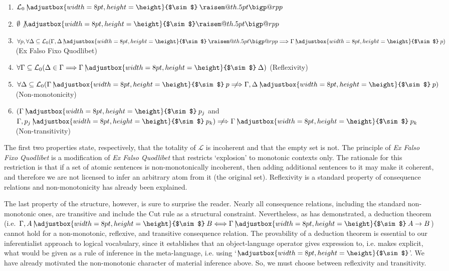 \documentclass{svjour3}                     %
\makeatletter
\newcommand{\raisemath}[1]{\mathpalette{\raisem@th{#1}}}
\newcommand{\raisem@th}[3]{\raisebox{#1}{$#2#3$}}
\newcommand{\bigperpp}{%
  \mathop{\mathpalette\bigp@rpp\relax}%
  \displaylimits
}
\newcommand{\bigp@rpp}[2]{%
  \vcenter{
    \m@th\hbox{\scalebox{\ifx#1\displaystyle1.3\else1.3\fi}{$#1\perp$}}
  }%
}
\newcommand{\bigperp}{\raisemath{.5pt}{\bigperpp}}
\newcommand{\ssim}{%
     \setbox0=\hbox{$\sim$}%
     \adjustbox{width=8pt,height=\height}{$\sim$}
}
\newcommand{\nmc}{\mathbin{\mid\joinrel\!\!\ssim}}
\makeatother
\begin{document}
\begin{enumerate}
\item $ \mathcal{L}_0\nmc\bigperp$
\item $ \emptyset\not\nmc\bigperp $
\item $ \forall p, \forall\Delta\subseteq\mathcal{L}_0(\Gamma, \Delta \nmc\bigperp \Longrightarrow \Gamma\nmc p) $ (Ex Falso Fixo Quodlibet)
\item $\forall \Gamma\subseteq\mathcal{L}_0 (\Delta \in \Gamma \Longrightarrow \Gamma\nmc \Delta)$ (Reflexivity)
\item $\forall\Delta\subseteq\mathcal{L}_0(\Gamma\nmc p \,\,\not\!\!\Longrightarrow \Gamma, \Delta \nmc p)$ (Non-monotonicity)
\item $(\Gamma\nmc p_j $ and $ \Gamma, p_j \nmc p_k ) \,\,\not\!\!\Longrightarrow \Gamma \nmc p_k$ (Non-transitivity)
\end{enumerate}

The first two properties state, respectively, that the totality of $ \mathcal{L} $ is incoherent and that the empty set is not. The principle of \textit{Ex Falso Fixo Quodlibet} is a modification of \textit{Ex Falso Quodlibet} that restricts `explosion' to monotonic contexts only. The rationale for this restriction is that if a set of atomic sentences is non-monotonically incoherent, then adding additional sentences to it may make it coherent, and therefore we are not licensed to infer an arbitrary atom from it (the original set). Reflexivity is a standard property of consequence relations and non-monotonicity has already been explained. 

The last property of the structure, however, is sure to surprise the reader. Nearly all consequence relations, including the standard non-monotonic ones, are transitive and include the Cut rule as a structural constraint. Nevertheless, as \cite{Morgan2000} has demonstrated,  a deduction theorem (i.e. $\Gamma, A \nmc B \Longleftrightarrow \Gamma \nmc A \rightarrow B $) cannot hold for a non-monotonic, reflexive, and transitive consequence relation.  The provability of a deduction theorem is essential to our inferentialist approach to logical vocabulary, since it establishes that an object-language operator gives expression to, i.e. makes explicit, what would be given as a rule of inference in the meta-language, i.e. using `$ \nmc $'. We have already motivated the non-monotonic character of material inference above. So, we must choose between  reflexivity and transitivity. 
\end{document}
